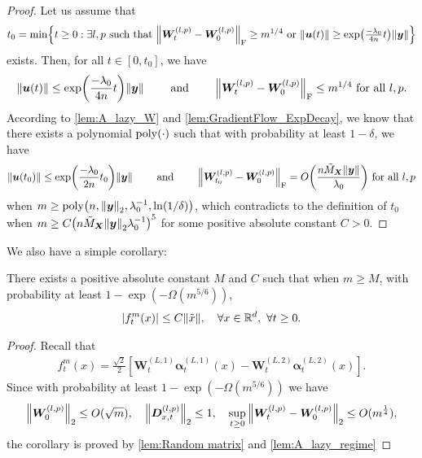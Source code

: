 \begin{proof}
  Let us assume that
  \begin{align*}
    t_0 = \min\dkm{t\geq 0:\exists l,p~\text{such that}~
    \norm{\bm{W}^{(l,p)}_t - \bm{W}^{(l,p)}_0}_{\mr{F}} \geq m^{1/4}~\text{or}~\norm{\bm{u}(t)} \geq \exp(\tfrac{-\lambda_0}{4n}t) \norm{\bm{y}}}
  \end{align*}
  exists.
  Then, for all $t \in  [0,t_0]$, we have
  \begin{align*}
    \begin{gathered}
      \norm{\bm{u}(t)} \leq \exp(\frac{-\lambda_0}{4n}t) \norm{\bm{y}}\qquad~\text{and}~\qquad
      \norm{\bm{W}^{(l,p)}_t - \bm{W}^{(l,p)}_0}_{\mathrm{F}} \leq m^{1/4}~\text{for all}~l, p.
    \end{gathered}
  \end{align*}
  According to \cref{lem:A_lazy_W} and \cref{lem:GradientFlow_ExpDecay}, we know that there exists a polynomial $\mathrm{poly}(\cdot)$ such that with probability at least $1-\delta$, we have
  \begin{align*}
    \begin{gathered}
      \norm{\bm{u}(t_0)} \leq \exp(\frac{-\lambda_{0}}{2n}t_0)\norm{\bm{y}}\qquad~\text{and}~\qquad
      \norm{\bm{W}^{(l,p)}_{t_0}-\bm{W}^{(l,p)}_0 }_{\mr{F}} = O\xkm{\frac{n\tilde{M}_{\bm{X}}\norm{\bm{y}}}{\lambda_0}}~\text{for all}~l, p
    \end{gathered}
  \end{align*}
  when $m\geq \poly\xkm{n,\norm{\bm{y}}_2,\lambda_0^{-1},\ln(1/\delta)}$,
  which contradicts to the definition of $t_0$ when $m\geq C\xkm{n\tilde{M}_{\bm{X}}\norm{\bm{y}}_2\lambda_0^{-1}}^5$ for some positive absolute constant $C>0$.
\end{proof}
We also have a simple corollary:
\begin{corollary}
  \label{cor:UpperboundNN}
  There exists a positive absolute constant $M$ and $C$ such that when $m \geq M$,
  with probability at least $1-\exp(-\Omega(m^{5/6}))$,
  \begin{align*}
    \abs{f_t^m(x)} \leq  C \norm{\tilde{x}}, \quad \forall x \in \mathbb{R}^d,~ \forall t \geq 0.
  \end{align*}
\end{corollary}
\begin{proof}
  Recall that
  \begin{align*}
    f_t^m(x) = \frac{\sqrt{2}}{2}[\bm{W}^{(L,1)}_t\bm{\alpha}_t^{(L,1)}(x) - \bm{W}^{(L,2)}_t\bm{\alpha}_t^{(L,2)}(x) ].
  \end{align*}
  Since with probability at least $1-\exp(-\Omega(m^{5/6}))$ we have
  \begin{align*}
    \norm{\bm{W}_0^{(l,p)}}_2\leq O(\sqrt{m}),\quad \norm{\bm{D}_{x,t}^{(l,p)}}_2 \leq 1,\quad \sup_{t\geq 0}\norm{\bm{W}_t^{(l,p)} - \bm{W}_0^{(l,p)}}_2 \leq O(m^\frac{1}{4}),
  \end{align*}
  the corollary is proved by \cref{lem:Random matrix} and \cref{lem:A_lazy_regime}
\end{proof}

